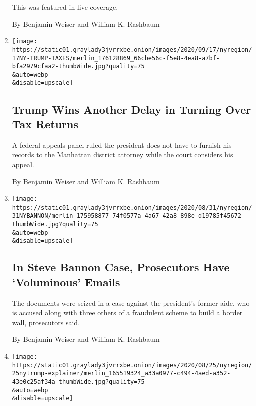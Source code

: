 \begin{enumerate}
  This was featured in live coverage.

  By Benjamin Weiser and William K. Rashbaum
\item
  \href{/2020/09/01/nyregion/trump-taxes-vance-lawsuit.html}{}

  \texttt{[image: https://static01.graylady3jvrrxbe.onion/images/2020/09/17/nyregion/17NY-TRUMP-TAXES/merlin\_176128869\_66cbe56c-f5e8-4ea8-a7bf-bfa2979cfaa2-thumbWide.jpg?quality=75\\\&auto=webp\\\&disable=upscale]}

  \hypertarget{trump-wins-another-delay-in-turning-over-tax-returns}{%
  \subsection{Trump Wins Another Delay in Turning Over Tax
  Returns}\label{trump-wins-another-delay-in-turning-over-tax-returns}}

  A federal appeals panel ruled the president does not have to furnish
  his records to the Manhattan district attorney while the court
  considers his appeal.

  By Benjamin Weiser and William K. Rashbaum
\item
  \href{/2020/08/31/nyregion/steve-bannon-build-the-wall-fraud.html}{}

  \texttt{[image: https://static01.graylady3jvrrxbe.onion/images/2020/08/31/nyregion/31NYBANNON/merlin\_175958877\_74f0577a-4a67-42a8-898e-d19785f45672-thumbWide.jpg?quality=75\\\&auto=webp\\\&disable=upscale]}

  \hypertarget{in-steve-bannon-case-prosecutors-have-voluminous-emails}{%
  \subsection{In Steve Bannon Case, Prosecutors Have `Voluminous'
  Emails}\label{in-steve-bannon-case-prosecutors-have-voluminous-emails}}

  The documents were seized in a case against the president's former
  aide, who is accused along with three others of a fraudulent scheme to
  build a border wall, prosecutors said.

  By Benjamin Weiser and William K. Rashbaum
\item
  \href{/2020/08/26/nyregion/trump-letitia-james-investigation.html}{}

  \texttt{[image: https://static01.graylady3jvrrxbe.onion/images/2020/08/25/nyregion/25nytrump-explainer/merlin\_165519324\_a33a0977-c494-4aed-a352-43e0c25af34a-thumbWide.jpg?quality=75\\\&auto=webp\\\&disable=upscale]}


\end{enumerate}
